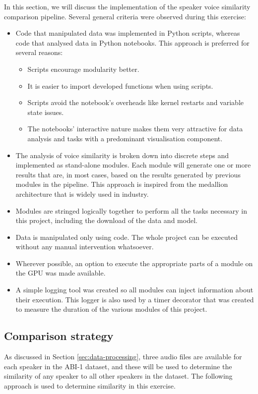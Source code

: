 \documentclass[conference]{IEEEtran}
\begin{document}
In this section, we will discuss the implementation of the speaker voice similarity comparison pipeline. Several general criteria were observed during this exercise:
\begin{itemize}
	\item Code that manipulated data was implemented in Python scripts, whereas code that analysed data in Python notebooks. This approach is preferred for several reasons:
	\begin{itemize}
		\item Scripts encourage modularity better.
		\item It is easier to import developed functions when using scripts.
		\item Scripts avoid the notebook's overheads like kernel restarts and variable state issues.
		\item The notebooks' interactive nature makes them very attractive for data analysis and tasks with a predominant visualisation component.
	\end{itemize}
	\item The analysis of voice similarity is broken down into discrete steps and implemented as stand-alone modules.    Each module will generate one or more results that are, in most cases, based on the results generated by previous modules in the pipeline. This approach is inspired from the medallion architecture that is widely used in industry.
	\item Modules are stringed logically together to perform all the tasks necessary in this project, including the download of the data and model.
	\item Data is manipulated only using code. The whole project can be executed without any manual intervention whatsoever.
	\item Wherever possible, an option to execute the appropriate parts of a module on the GPU was made available.
	\item A simple logging tool was created so all modules can inject information about their execution. This logger is also used by a timer decorator that was created to measure the duration of the various modules of this project.
\end{itemize}

\subsection{Comparison strategy}
\label{ssec:comparison-strategy}

As discussed in Section \ref{sec:data-processing}, three audio files are available for each speaker in the ABI-1 dataset, and these will be used to determine the similarity of any speaker to all other speakers in the dataset. The following approach is used to determine similarity in this exercise.
\end{document}
